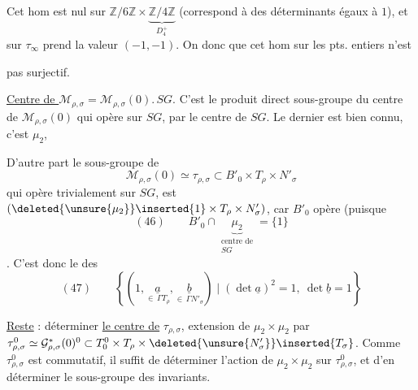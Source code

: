 Cet hom est nul sur $\mathbb Z/6\mathbb Z\times\underbrace{\mathbb Z/4\mathbb Z}_{D_4^+}$  (correspond à des déterminants égaux à $1$), et sur $\tau_\infty$ prend la valeur $(-1,-1)$. On  donc que cet hom sur les pts. entiers n'est


pas surjectif.

\uline{Centre de $\mathcal M_{\rho,\sigma}$}$=\mathcal M_{\rho,\sigma}(0).\,SG$. C'est le produit direct  sous-groupe du centre de $\mathcal M_{\rho,\sigma}(0)$ qui opère  sur $SG$, par le  centre de $SG$. Le dernier  est bien connu, c'est $\mu_2$,  


D'autre part le sous-groupe de
\[
\mathcal M_{\rho,\sigma}(0)\simeq\tau_{\rho,\sigma}\subset B'_0\times T_\rho\times N'_\sigma
\]
qui opère trivialement sur $SG$, est  $(\deleted{\unsure{\mu_2}}\inserted{1}\times T_\rho\times N'_\sigma)$, car $B'_0$ opère   (puisque
\[
(46)\qquad B'_0\cap\underbrace{\mu_2}_{\substack{\text{centre de}\\SG}}=\{1\}
\]
. C'est donc le  des
\[
(47)\qquad
\left\{\left(1,\underset{\in\,\Gamma T_\rho}{\underline a},\underset{\in\,\Gamma N'_\sigma}{\underline b}\right)\mid(\det\underline a)^2=1,\ \det\underline b=1\right\}
\]

\uline{Reste} : déterminer \uline{le centre de} $\tau_{\rho,\sigma}$, extension de $\mu_2\times\mu_2$ par $\tau^0_{\rho,\sigma}\simeq\mathcal G^*_{\rho,\sigma}(0)^0\subset T_0^0\times T_\rho\times\deleted{\unsure{N'_\sigma}}\inserted{T_\sigma}$. Comme $\tau^0_{\rho,\sigma}$ est commutatif, il suffit de déterminer l'action de $\mu_2\times\mu_2$ sur $\tau^0_{\rho,\sigma}$, et d'en déterminer le sous-groupe des invariants.

